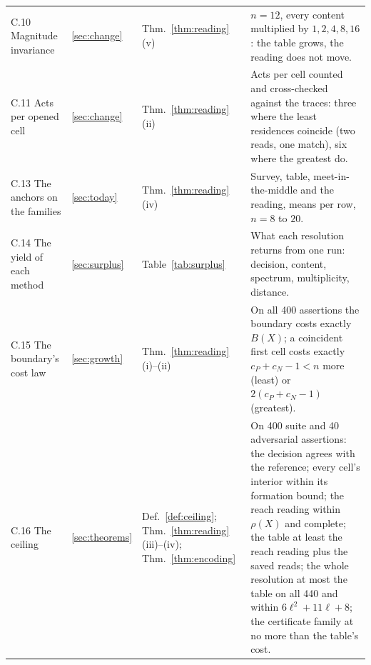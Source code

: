 \documentclass[pdflatex,sn-mathphys-num]{sn-jnl}
\theoremstyle{thmstyleone}%
\theoremstyle{thmstyletwo}%
\theoremstyle{thmstylethree}%
\begin{document}
\begin{appendices}
\begin{longtable}{@{} p{} p{} p{} p{} @{}}
C.10 Magnitude invariance & \ref{sec:change} & Thm.~\ref{thm:reading}(v) & $n=12$, every content multiplied by $1,2,4,8,16$: the table grows, the reading does not move. \\
C.11 Acts per opened cell & \ref{sec:change} & Thm.~\ref{thm:reading}(ii) & Acts per cell counted and cross-checked against the traces: three where the least residences coincide (two reads, one match), six where the greatest do. \\
C.13 The anchors on the families & \ref{sec:today} & Thm.~\ref{thm:reading}(iv) & Survey, table, meet-in-the-middle and the reading, means per row, $n=8$ to $20$. \\
C.14 The yield of each method & \ref{sec:surplus} & Table~\ref{tab:surplus} & What each resolution returns from one run: decision, content, spectrum, multiplicity, distance. \\
C.15 The boundary's cost law & \ref{sec:growth} & Thm.~\ref{thm:reading}(i)--(ii) & On all 400 assertions the boundary costs exactly $B(X)$; a coincident first cell costs exactly $c_P+c_N-1<n$ more (least) or $2(c_P+c_N-1)$ (greatest). \\
C.16 The ceiling & \ref{sec:theorems} & Def.~\ref{def:ceiling}; Thm.~\ref{thm:reading}(iii)--(iv); Thm.~\ref{thm:encoding} & On 400 suite and 40 adversarial assertions: the decision agrees with the reference; every cell's interior within its formation bound; the reach reading within $\rho(X)$ and complete; the table at least the reach reading plus the saved reads; the whole resolution at most the table on all 440 and within $6\ell^2+11\ell+8$; the certificate family at no more than the table's cost. \\
\end{longtable}\endgroup


\end{appendices}
\end{document}
